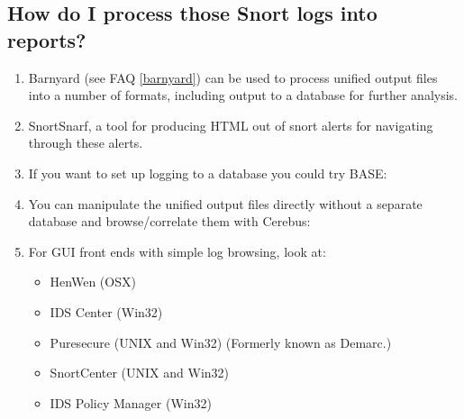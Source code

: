 \documentclass{article}
\newcommand{\myref}[1]{(see FAQ \ref{#1})}
\begin{document}

\subsection{How do I process those Snort logs into reports?}
\begin{enumerate}
\item  Barnyard \myref{barnyard} can be used to process unified output files into a number of
    formats, including output to a database for further analysis.
\item  SnortSnarf, a tool for producing HTML out of snort alerts for navigating
    through these alerts.


\item  If you want to set up logging to a database you could try BASE:


\item  You can manipulate the unified output files directly without a separate
    database and browse/correlate them with Cerebus:


\item For GUI front ends with simple log browsing, look at:
    \begin{itemize}
      \item HenWen (OSX)



      \item IDS Center (Win32) \label{IDSCenter}


     \item Puresecure (UNIX and Win32) (Formerly known as Demarc.)


      \item SnortCenter (UNIX and Win32)


      \item IDS Policy Manager (Win32)

 \end{itemize}
 \end{enumerate}
\end{document}
